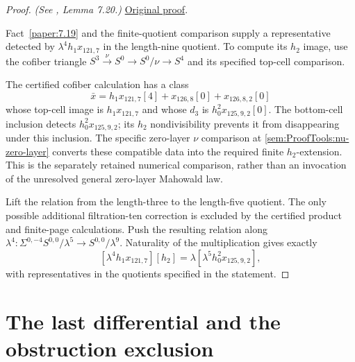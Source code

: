 \begin{proof}
\textit{(See \cite{LWX126}, Lemma 7.20.)} \href{paper/main.tex.html#L2622}{Original proof}.

Fact~\ref{paper:7.19} and the finite-quotient comparison supply a representative detected by $\lambda^4h_1x_{121,7}$ in the length-nine quotient. To compute its $h_2$ image, use the cofiber triangle $S^3\xrightarrow{\nu}S^0\to S^0/\nu\to S^4$ and its specified top-cell comparison.

The certified cofiber calculation has a class
\[
 \bar x=h_1x_{121,7}[4]+x_{126,8}[0]+x_{126,8,2}[0]
\]
whose top-cell image is $h_1x_{121,7}$ and whose $d_3$ is $h_0^2x_{125,9,2}[0]$. The bottom-cell inclusion detects $h_0^2x_{125,9,2}$; its $h_2$ nondivisibility prevents it from disappearing under this inclusion. The specific zero-layer $\nu$ comparison at \ref{sem:ProofTools:nu-zero-layer} converts these compatible data into the required finite $h_2$-extension. This is the separately retained numerical comparison, rather than an invocation of the unresolved general zero-layer Mahowald law.

Lift the relation from the length-three to the length-five quotient. The only possible additional filtration-ten correction is excluded by the certified product and finite-page calculations. Push the resulting relation along $\lambda^4: \Sigma^{0,-4}S^{0,0}/\lambda^5\to S^{0,0}/\lambda^9$. Naturality of the multiplication gives exactly
\[
 [\lambda^4h_1x_{121,7}][h_2]
       =\lambda[\lambda^5h_0^2x_{125,9,2}],
\]
with representatives in the quotients specified in the statement.
\end{proof}

\section{The last differential and the obstruction exclusion}

